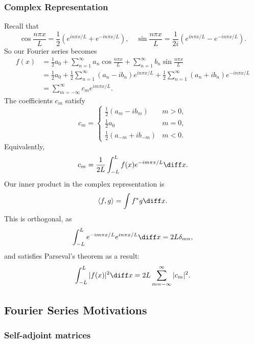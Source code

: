 \documentclass[12pt]{article}
\begin{document}
\subsubsection{Complex Representation}%
\label{subsub:complex_representation}

Recall that
\[
	\cos \frac{n \pi x}{L} = \frac{1}{2} \left( e^{i n \pi x/L} + e^{-i n \pi x/L}\right), \quad \sin \frac{n \pi x}{L} = \frac{1}{2i} \left(e^{i n \pi x/L} - e^{-i n \pi x/L}\right)
.\]
So our Fourier series becomes
\begin{align*}
	f(x) &= \frac{1}{2} a_0 + \sum_{n = 1}^{\infty}a_n \cos \frac{n \pi x}{L} + \sum_{n = 1}^{\infty} b_n \sin \frac{n \pi x}{L} \\
	     &= \frac{1}{2} a_0 + \frac{1}{2} \sum_{n = 1}^{\infty}(a_n - i b_n) e^{i n \pi x/L} + \frac{1}{2} \sum_{n = 1}^{\infty}(a_n + i b_n) e^{-i n \pi x/L} \\
	     &= \sum_{m = -\infty}^{\infty} c_m e^{i m \pi x/L}.
\end{align*}
The coefficients $c_m$ satisfy
\[
c_m =
\begin{cases}
	\frac{1}{2}(a_{m} - ib_{m}) & m > 0, \\
	\frac{1}{2} a_0 & m = 0, \\
	\frac{1}{2}(a_{-m} + i b_{-m}) & m < 0.
\end{cases}
\]
Equivalently,
\[
	c_m = \frac{1}{2L}\int_{-L}^{L}f(x) e^{-i m \pi x/L}\diff x
.\]
Our inner product in the complex representation is
\[
	\langle f, g \rangle = \int f^{\ast}g \diff x
.\]
This is orthogonal, as
\[
\int_{-L}^{L} e^{-i m \pi x/L}e^{i n \pi x/L} \diff x = 2L \delta_{mn}
,\]
and satisfies Parseval's theorem as a result:
\[
	\int_{-L}^{L}|f(x)|^2\diff x = 2L \sum_{m = -\infty}^{\infty}|c_m|^2
.\]

\subsection{Fourier Series Motivations}%
\label{sub:fourier_series_motivations}

\subsubsection{Self-adjoint matrices}%
\label{subsub:self_adjoint_matrices}
\end{document}
